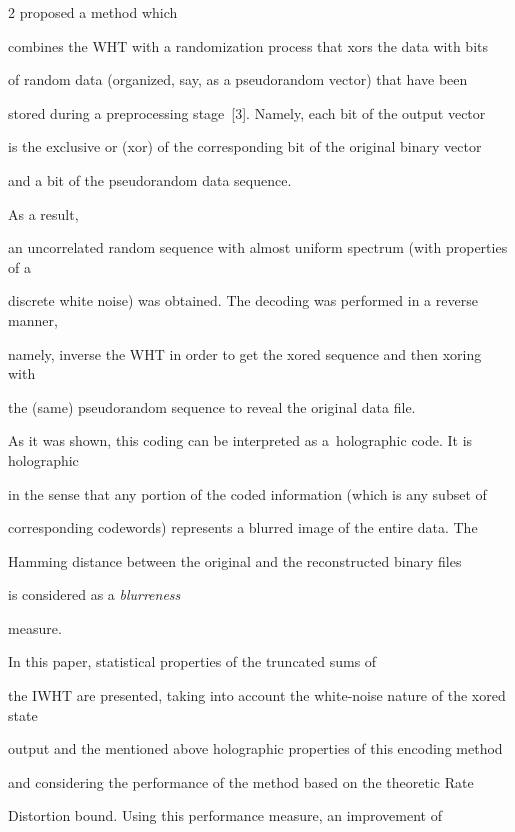 \begin{multicols}{2}
proposed a method which 

combines the  WHT  with  a randomization process that xors the data with bits 

of random data (organized, say, as a pseudorandom vector) that have been 

stored during a preprocessing stage~[3]. Namely, each bit of the output vector 

is the exclusive or (xor) of the corresponding bit of the original binary vector 

and a  bit of the pseudorandom data sequence. 



As a result,  

an uncorrelated random sequence with almost uniform spectrum (with properties of a 

discrete white noise) was obtained. The decoding was performed in a reverse manner, 

namely, inverse the WHT in order to get the xored sequence and then xoring with 

the (same) pseudorandom sequence to reveal the original data file.

{



}



As it was shown, this coding can be interpreted as a~holographic code. It is holographic 

in the sense that any portion of the coded information (which is any subset of 

corresponding codewords) represents a blurred image of the entire data.  The 

Hamming distance between the original and the reconstructed binary files 

is considered as a {\it blurreness} 

measure.



In this paper,  statistical properties of the truncated sums of 

the IWHT are presented, taking into account the white-noise nature of the xored state 

output and the mentioned above holographic properties of this encoding method 

and considering the performance of the method based on the theoretic Rate 

Distortion bound. Using this performance measure,  an improvement of 


\end{multicols}
